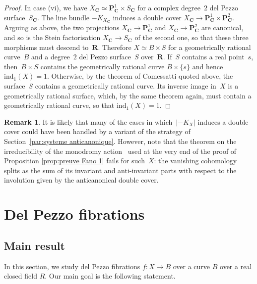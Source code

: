 \documentclass[JEP,XML,SOM,Unicode]{cedram}
\theoremstyle{plain}
\theoremstyle{definition}
\newtheorem{rmk}[thm]{Remark}
\numberwithin{equation}{section}
\renewcommand{\C}{{\mathbf C}}
\renewcommand{\P}{{\mathbf P}}
\newcommand{\R}{{\mathbf R}}
\newcommand{\elw}{\mathrm{ind}}
\begin{document}
\begin{proof}
In case (vi), we have $X_{\C}\simeq \P^1_{\C}\times S_{\C}$ for a complex
degree~$2$ del Pezzo surface~$S_{\C}$. The line bundle $-K_{X_{\C}}$
induces a double cover $X_{\C}\to\P^1_{\C}\times\P^2_{\C}$.
Arguing as above,
the two projections
$X_{\C}\to\P^1_\C$ and $X_\C\to \P^2_{\C}$
are canonical,
and so is the Stein factorisation $X_{\C}\to S_{\C}$ of the second one,
so that
these three morphisms must
descend to~$\R$. Therefore $X\simeq B\times S$ for a geometrically rational curve~$B$
and a degree~$2$ del Pezzo surface~$S$ over~$\R$.
If~$S$ contains a real point~$s$,
then~$B \times S$ contains the geometrically rational curve $B \times \{s\}$
and hence $\elw_1(X)=1$.
Otherwise,
by the theorem of Comessatti quoted above,
the surface~$S$ contains a geometrically rational curve.
Its inverse image in~$X$ is a geometrically rational surface,
which, by the same theorem again, must contain a geometrically rational curve,
so that $\elw_1(X)=1$.
\end{proof}

\begin{rmk}
It is likely that many of the cases in which~$|{-}K_X|$ induces a double
cover could have been handled by a variant of the strategy
of Section~\ref{par:systeme anticanonique}. However, note that the theorem on the
irreducibility of the monodromy action~\cite[Th.\,7.3.2]{Lamotke} used
at the very end of the proof of Proposition \ref{prop:preuve Fano 1} fails
for such~$X$: the vanishing cohomology splits as the sum of its invariant
and anti-invariant parts with respect to the involution given by the
anticanonical double cover.
\end{rmk}

\section{Del Pezzo fibrations}
\label{sec:dPfibrations}

\subsection{Main result}

In this section, we study del Pezzo fibrations $f:X\to B$ over a curve $B$ over a real closed field $R$.
Our main goal is the following statement.
\end{document}
